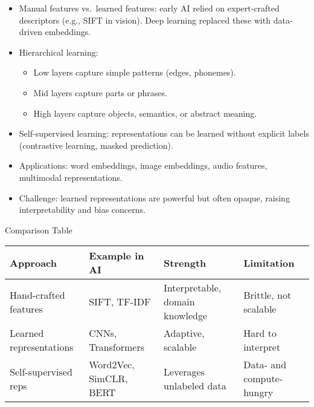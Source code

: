 \documentclass[
  letterpaper,
  DIV=11,
  numbers=noendperiod]{scrreprt}
\providecommand{\tightlist}{%
  \setlength{\itemsep}{0pt}\setlength{\parskip}{0pt}}
\begin{document}
\begin{itemize}
\item
  Manual features vs.~learned features: early AI relied on
  expert-crafted descriptors (e.g., SIFT in vision). Deep learning
  replaced these with data-driven embeddings.
\item
  Hierarchical learning:

  \begin{itemize}
  \tightlist
  \item
    Low layers capture simple patterns (edges, phonemes).
  \item
    Mid layers capture parts or phrases.
  \item
    High layers capture objects, semantics, or abstract meaning.
  \end{itemize}
\item
  Self-supervised learning: representations can be learned without
  explicit labels (contrastive learning, masked prediction).
\item
  Applications: word embeddings, image embeddings, audio features,
  multimodal representations.
\item
  Challenge: learned representations are powerful but often opaque,
  raising interpretability and bias concerns.
\end{itemize}

Comparison Table

\begin{longtable}[]{@{}
  >{\raggedright\arraybackslash}p{}
  >{\raggedright\arraybackslash}p{}
  >{\raggedright\arraybackslash}p{}
  >{\raggedright\arraybackslash}p{}@{}}
\toprule\noalign{}
\begin{minipage}[b]{\linewidth}\raggedright
Approach
\end{minipage} & \begin{minipage}[b]{\linewidth}\raggedright
Example in AI
\end{minipage} & \begin{minipage}[b]{\linewidth}\raggedright
Strength
\end{minipage} & \begin{minipage}[b]{\linewidth}\raggedright
Limitation
\end{minipage} \\
\midrule\noalign{}
\endhead
\bottomrule\noalign{}
\endlastfoot
Hand-crafted features & SIFT, TF-IDF & Interpretable, domain knowledge &
Brittle, not scalable \\
Learned representations & CNNs, Transformers & Adaptive, scalable & Hard
to interpret \\
Self-supervised reps & Word2Vec, SimCLR, BERT & Leverages unlabeled data
& Data- and compute-hungry \\
\end{longtable}
\end{document}

